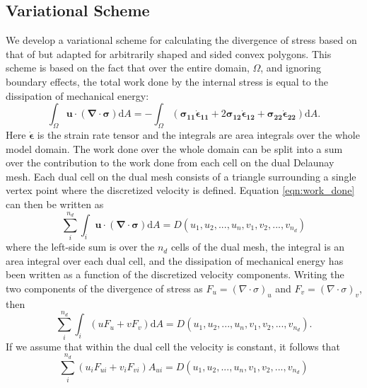 \subsection{Variational Scheme}

We develop a variational scheme for calculating the divergence of stress based on that of \citet{Hunke02} but adapted for arbitrarily shaped and sided convex polygons. This scheme is based on the fact that over the entire domain, $\Omega$, and ignoring boundary effects, the total work done by the internal stress is equal to the dissipation of mechanical energy:
\begin{equation}
\int_\Omega \boldsymbol{u} \cdot (\boldsymbol{\nabla} \cdot \boldsymbol{\sigma}) \mathrm{d}A = -\int_\Omega (\boldsymbol{\sigma_{11}} \boldsymbol{\dot{\epsilon}_{11}}  + 2 \boldsymbol{\sigma_{12}} \boldsymbol{\dot{\epsilon}_{12}} + \boldsymbol{\sigma_{22}} \boldsymbol{\dot{\epsilon}_{22}}) \mathrm{d}A.
\label{eqn:work_done}
\end{equation}
Here $\boldsymbol{\dot{\epsilon}}$ is the strain rate tensor and the integrals are area integrals over the whole model domain. The work done over the whole domain can be split into a sum over the contribution to the work done from each cell on the dual Delaunay mesh. Each dual cell on the dual mesh consists of a triangle surrounding a single vertex point where the discretized velocity is defined. Equation \ref{eqn:work_done} can then be written as
\begin{equation}
\sum_i^{n_d} \int_i \boldsymbol{u} \cdot (\boldsymbol{\nabla} \cdot \boldsymbol{\sigma}) \mathrm{d}A = D(u_1, u_2, ..., u_n, v_1, v_2, ..., v_{n_d})
\end{equation}
where the left-side sum is over the $n_d$ cells of the dual mesh, the integral is an area integral over each dual cell,  and the dissipation of mechanical energy has been written as a function of the discretized velocity components.
Writing the two components of the divergence of stress as $F_u=(\nabla \cdot \sigma)_u$ and $F_v=(\nabla \cdot \sigma)_v$, then
\begin{equation}
\sum_i^{n_d} \int_i (uF_u + vF_v) \mathrm{d}A = D(u_1, u_2, ..., u_n, v_1, v_2, ..., v_{n_d}).
\end{equation}
If we assume that within the dual cell the velocity is constant, it follows that
\begin{equation}
\sum_i^{n_d} (u_i F_{ui} + v_i F_{vi}) A_{ui} = D(u_1, u_2, ..., u_n, v_1, v_2, ..., v_{n_d})
\end{equation}

